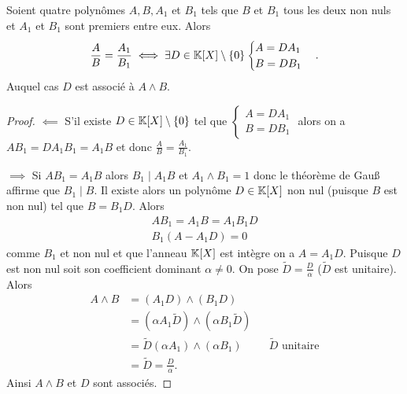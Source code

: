 \begin{theo}
  Soient quatre polynômes \(A,B,A_1\) et \(B_1\) tels que \(B\) et \(B_1\) tous les deux non nuls et \(A_1\) et \(B_1\) sont premiers entre eux. Alors
  \begin{equation}
    \frac{A}{B}=\frac{A_1}{B_1} \iff \exists D \in \mathbb{K}[X]\setminus\{0\} \begin{cases} A=DA_1 \\ B=DB_1 \end{cases}.
  \end{equation}
  Auquel cas \(D\) est associé à \(A\wedge B\).
\end{theo}
\begin{proof}
  \(\impliedby\) S'il existe \(D \in \mathbb{K}[X]\setminus\{0\}\) tel que \( \begin{cases} A=DA_1 \\ B=DB_1 \end{cases}\) alors on a \(AB_1=DA_1B_1=A_1B\) et donc \(\frac{A}{B}=\frac{A_1}{B_1}\).

  \(\implies\) Si \(AB_1=A_1B\) alors \(B_1 \mid{}A_1B\) et \(A_1 \wedge B_1=1\) donc le théorème de Gau\ss{} affirme que \(B_1\mid{}B\). Il existe alors un polynôme \(D \in \mathbb{K}[X]\) non nul (puisque \(B\) est non nul) tel que \(B=B_1D\). Alors
  \begin{align}
    AB_1=A_1B=A_1B_1D \\
    B_1(A-A_1D)=0
  \end{align}
  comme \(B_1\) et non nul et que l'anneau \(\mathbb{K}[X]\) est intègre on a \(A=A_1D\). Puisque \(D\) est non nul soit son coefficient dominant \(\alpha \neq 0\). On pose \(\widetilde{D}=\frac{D}{\alpha}\) (\(\widetilde{D}\) est unitaire). Alors
  \begin{align}
    A \wedge B &= (A_1D) \wedge (B_1D) \\
    & = (\alpha A_1 \widetilde{D}) \wedge (\alpha B_1 \widetilde{D}) \\
    & = \widetilde{D} (\alpha A_1) \wedge (\alpha B_1) && \widetilde{D} \text{~unitaire}\\
    & = \widetilde{D} = \frac{D}{\alpha}.
  \end{align}
  Ainsi \(A \wedge B\) et \(D\) sont associés.
\end{proof}

